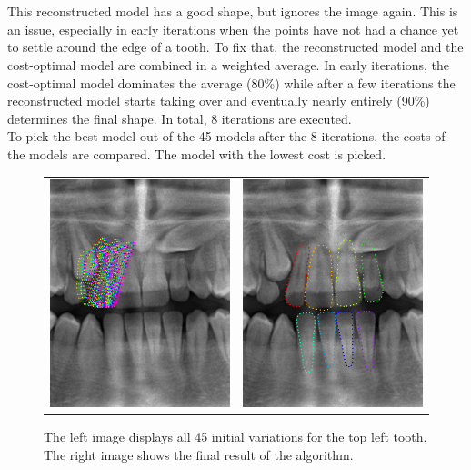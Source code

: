 \documentclass[a4paper,10pt]{article}
\begin{document}
\\\\
This reconstructed model has a good shape, but ignores the image again. This is an issue, especially in early iterations when the points have not had a chance yet to settle around the edge of a tooth. To fix that, the reconstructed model and the cost-optimal model are combined in a weighted average. In early iterations, the cost-optimal model dominates the average (80\%) while after a few iterations the reconstructed model starts taking over and eventually nearly entirely (90\%) determines the final shape. In total, 8 iterations are executed.
\\
To pick the best model out of the 45 models after the 8 iterations, the costs of the models are compared. The model with the lowest cost is picked.
\begin{figure}[!h]
\begin{tabular}{cc}
\includegraphics[width=80mm]{tooth_variations.png} & \includegraphics[width=80mm]{tooth_result_1.png}\\
 
\end{tabular}
 \caption{The left image displays all 45 initial variations for the top left tooth. The right image shows the final result of the algorithm.}
\end{figure}
\end{document}

